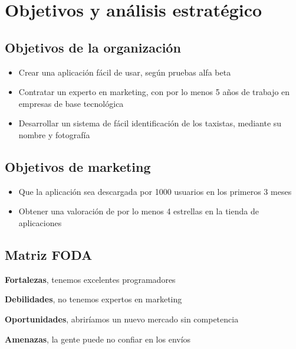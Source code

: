 \chapter{Objetivos y análisis estratégico}

\section{Objetivos de la organización}

\begin{itemize}
\item Crear una aplicación fácil de usar, según pruebas alfa beta
\item Contratar un experto en marketing, con por lo menos 5 años de trabajo en empresas de base tecnológica
\item Desarrollar un sistema de fácil identificación de los taxistas, mediante su nombre y fotografía
\end{itemize}


\section{Objetivos de marketing}

\begin{itemize}
\item Que la aplicación sea descargada por 1000 usuarios en los primeros 3 meses
\item Obtener una valoración de por lo menos 4 estrellas en la tienda de aplicaciones
\end{itemize}

\section{Matriz FODA}

\textbf{Fortalezas}, tenemos excelentes programadores

\textbf{Debilidades}, no tenemos expertos en marketing

\textbf{Oportunidades}, abriríamos un nuevo mercado sin competencia

\textbf{Amenazas}, la gente puede no confiar en los envíos


